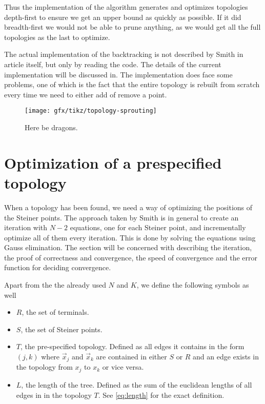 Thus the implementation of the algorithm generates and optimizes topologies
depth-first to ensure we get an upper bound as quickly as possible.  If it did
breadth-first we would not be able to prune anything, as we would get all the
full topologies as the last to optimize.

The actual implementation of the backtracking is not described by Smith in
article itself, but only by reading the code.  The details of the current
implementation will be discussed in.  The implementation does face some problems, one of which is
the fact that the entire topology is rebuilt from scratch every time we need to
either add of remove a point.

\begin{figure}[htbp] \centering
    \texttt{[image: gfx/tikz/topology-sprouting]}
    \caption{Here be dragons.\label{fig:topology-sprouting}}
\end{figure}

\section{Optimization of a prespecified topology}
\label{sec:optim-presp-topol}

When a topology has been found, we need a way of optimizing the positions of the
Steiner points.  The approach taken by Smith is in general to create an
iteration with $N-2$ equations, one for each Steiner point, and incrementally
optimize all of them every iteration.  This is done by solving the equations
using Gauss elimination.  The section will be concerned with describing the
iteration, the proof of correctness and convergence, the speed of convergence
and the error function for deciding convergence.

Apart from the the already used $N$ and $K$, we define the following symbols as
well
\begin{itemize}
\item $R$, the set of terminals.
\item $S$, the set of Steiner points.
\item $T$, the pre-specified topology.  Defined as all edges it contains in the
form $(j,k)$ where $\vec x_j$ and $\vec x_k$ are contained in either $S$ or $R$
and an edge exists in the topology from $x_j$ to $x_k$ or vice versa.
\item $L$, the length of the tree.  Defined as the sum of the euclidean lengths
of all edges in in the topology $T$.  See \cref{eq:length} for the exact
definition.
\end{itemize}

